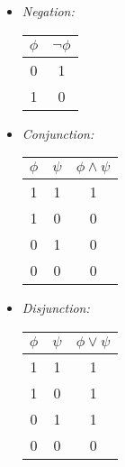 \documentclass[10pt,a4pape,twocolumn]{article}
\begin{document}
                \begin{itemize}
                        \item \textit{Negation:}
                            \begin{center}
                                \begin{tabular}{c||c}
                                    $\phi$ & $\neg\phi$ \\[0.5ex]
                                    \hline\hline 
                                    0 & 1\\
                                    1 & 0
                                \end{tabular}
                            \end{center}
                        \item \textit{Conjunction:} 
                            \begin{center}
                                \begin{tabular}{c|c||c}
                                    $\phi$ & $\psi$ & $\phi\land\psi$\\
                                    \hline\hline
                                    1 & 1 & 1\\
                                    1 & 0 & 0\\
                                    0 & 1 & 0\\
                                    0 & 0 & 0 
                                \end{tabular}
                            \end{center}
                        \item \textit{Disjunction:} 
                            \begin{center}
                                \begin{tabular}{c|c||c}
                                    $\phi$ & $\psi$ & $\phi\lor\psi$\\
                                    \hline\hline
                                    1 & 1 & 1 \\
                                    1 & 0 & 1 \\ 
                                    0 & 1 & 1 \\
                                    0 & 0 & 0 
                                \end{tabular}
                            \end{center}

\end{itemize}
\end{document}
